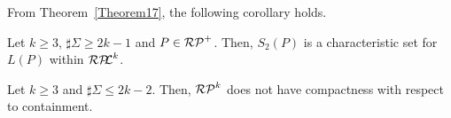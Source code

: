 From Theorem~\ref{Theorem17}, %
the following corollary holds.


\begin{col}%
    Let $k \geq 3$, $\sharp\Sigma \geq 2k-1$ and $P \in \mathcal{RP}^{+}$.
    Then, $S_{2}(P)$ is a characteristic set for $L(P)$ within $\mathcal{RP\!\!L}^{k}$.
\end{col}



\begin{lem}\label{Sato1:Lemma19}%
    Let $k \geq 3$ and $\sharp\Sigma \leq 2k-2$.
    Then, $\mathcal{RP}^{k}$ does not have compactness with respect to containment.
\end{lem}


